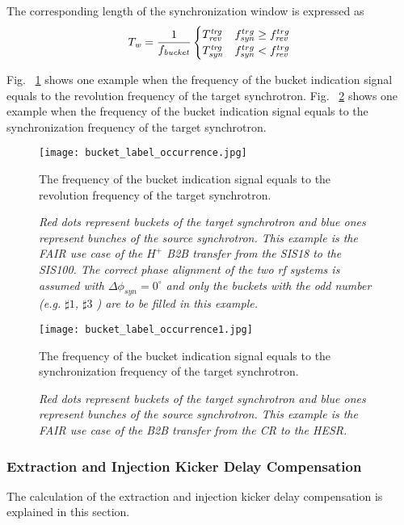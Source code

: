 The corresponding length of the synchronization window is expressed as
\begin{eqnarray}
T_\mathit{w}=\frac{1}{f_\mathit{bucket}}
\begin{cases}
T_\mathit{rev}^\mathit{trg} &f_{\mathit{syn}}^{trg}\ge f_{\mathit{rev}}^{trg}\cr

T_\mathit{syn}^\mathit{trg}
&f_{\mathit{syn}}^{trg}<f_{\mathit{rev}}^{trg}
\end{cases}
\end{eqnarray}


Fig. ~\ref{bucket_label_occurrence} shows one example when the frequency of the bucket indication signal equals to the revolution frequency of the target synchrotron. Fig. ~\ref{bucket_label_occurrence1} shows one example when the frequency of the bucket indication signal equals to the synchronization frequency of the target synchrotron. 
\begin{figure}[!htb]
   \centering   
   \texttt{[image: bucket\_label\_occurrence.jpg]}
   \caption{The frequency of the bucket indication signal equals to the revolution frequency of the target synchrotron.}
	\caption*{\textsl{\small{Red dots represent buckets of the target synchrotron and blue ones represent bunches of the source synchrotron. This example is the FAIR use case of the $H^+$ B2B transfer from the SIS18 to the SIS100. The correct phase alignment of the two rf systems is assumed with $\Delta\phi_\mathit{syn}=0^\circ$ and only the buckets with the odd number (e.g. $\sharp1$, $\sharp3$ ) are to be filled in this example.}}}
   \label{bucket_label_occurrence}
\end{figure}

\begin{figure}[!htb]
   \centering   
   \texttt{[image: bucket\_label\_occurrence1.jpg]}
   \caption{The frequency of the bucket indication signal equals to the synchronization frequency of the target synchrotron.}
	\caption*{\textsl{\small{Red dots represent buckets of the target synchrotron and blue ones represent bunches of the source synchrotron. This example is the FAIR use case of the B2B transfer from the CR to the HESR. }}}
   \label{bucket_label_occurrence1}
\end{figure}



\subsubsection{Extraction and Injection Kicker Delay Compensation}
The calculation of the extraction and injection kicker delay compensation is explained in this section.

